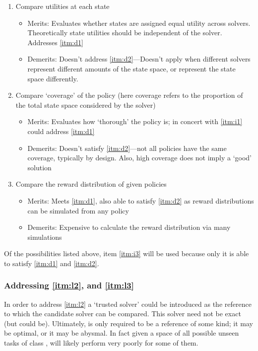         \begin{enumerate}
            \item Compare utilities at each state \label{itm:i1}
            \begin{itemize}
                \item Merits: Evaluates whether states are assigned equal utility across solvers. Theoretically state utilities should be independent of the solver. Addresses \ref{itm:d1}
                \item Demerits: Doesn't address \ref{itm:d2}---Doesn't apply when different solvers represent different amounts of the state space, or represent the state space differently.
            \end{itemize} 
            \item Compare `coverage' of the policy (here coverage refers to the proportion of the total state space considered by the solver) \label{itm:i2}
            \begin{itemize}
                \item Merits: Evaluates how `thorough' the policy is; in concert with \ref{itm:i1} could address \ref{itm:d1}
                \item Demerits: Doesn't satisfy \ref{itm:d2}---not all policies have the same coverage, typically by design. Also, high coverage does not imply a `good' solution
            \end{itemize}
            \item Compare the reward distribution of given policies \label{itm:i3}
            \begin{itemize}
                \item Merits: Meets \ref{itm:d1}, also able to satisfy \ref{itm:d2} as reward distributions can be simulated from any policy
                \item Demerits: Expensive to calculate the reward distribution via many simulations
            \end{itemize}
        \end{enumerate}

        Of the possibilities listed above, item \ref{itm:i3} will be used because only it is able to satisfy \ref{itm:d1} and \ref{itm:d2}.

    \subsubsection{Addressing \ref{itm:l2}, and \ref{itm:l3}} \label{sec:practicality}
        In order to address \ref{itm:l2} a `trusted solver' \solvestar{} could be introduced as the reference to which the candidate solver \solve{} can be compared. This solver need not be exact (but could be). Ultimately, \solvestar{} is only required to be a reference of some kind; it may be optimal, or it may be abysmal. In fact given a space of all possible unseen tasks of class \taskclass, \solvestar{} will likely perform very poorly for some of them.

